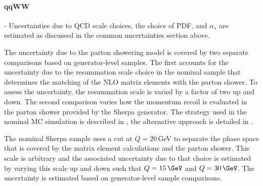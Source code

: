 \paragraph{qqWW} 
- 
Uncertainties due to QCD scale choices, the choice of PDF, and $\alpha_s$ are estimated as discussed in the common uncertainties section above.


The uncertainty due to the parton showering model is covered by two separate comparisons based on generator-level samples.
The first accounts for the uncertainty due to the resummation scale choice in the nominal sample that determines the matching of the NLO matrix elements with the parton shower. 
To assess the uncertainty, the resummation scale is varied by a factor of two up and down.
The second comparison varies how the momentum recoil is evaluated in the parton shower provided by the Sherpa generator. The strategy used in the nominal MC simulation is described in \cite{Hoeche:2009rj}, the alternative approach is detailed in \cite{Schumann:2007mg}. 

The nominal Sherpa sample uses a cut at $Q=20\,$GeV to separate the phase space that is covered by the matrix element calculations and the parton shower. This scale is arbitrary and the associated uncertainty due to that choice is estimated by varying this scale up and down such that $Q = 15\,\GeV$ and $Q = 30\,\GeV$. The uncertainty is estimated based on generator-level sample comparisons.




